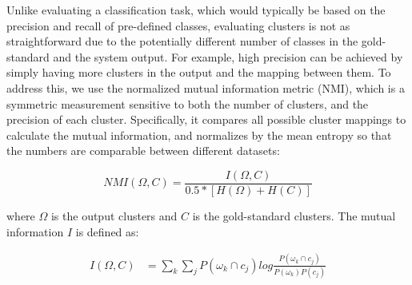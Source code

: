 Unlike evaluating a classification task, which would typically be based on
the precision and recall of pre-defined classes, evaluating clusters is not as
straightforward due to the potentially different number of classes in the gold-standard and 
the system output. For example, high precision can be achieved by simply having more
clusters in the output and the mapping between them.
To address this, we use the normalized mutual information metric (NMI), which is a symmetric measurement sensitive to both the
number of clusters, and the precision of each cluster.  Specifically, it
compares all possible cluster mappings to calculate the mutual information, and
normalizes by the mean entropy so that the numbers are comparable between different
datasets:



\vspace{-3mm}
\begin{equation}
NMI(\Omega, C) = \frac{I(\Omega, C)}{0.5 * [H(\Omega) + H(C)]}
\end{equation}
\vspace{-2mm}

where $\Omega$ is the output clusters and $C$ is the gold-standard clusters.
The mutual information $I$ is defined as:


\vspace{-3mm}
\begin{equation}
	\begin{split}
I(\Omega, C) & = \sum_k \sum_j P(\omega_k \cap c_j) log \frac{P(\omega_k \cap c_j)}{P(\omega_k)P(c_j)} 
	 \end{split}
 \end{equation}
\vspace{-2mm}

